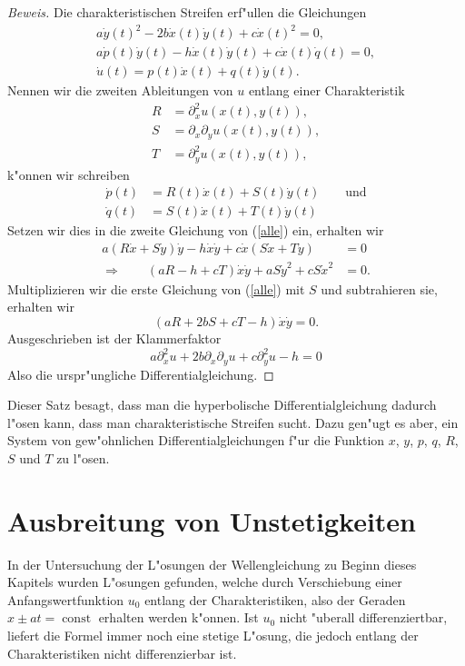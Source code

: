 \begin{proof}[Beweis]
Die charakteristischen Streifen erf"ullen die Gleichungen
\begin{equation}
\begin{gathered}
a\dot y(t)^2-2b\dot x(t)\dot y(t)+c\dot x(t)^2=0,
\\
a\dot p(t)\dot y(t)-h\dot x(t)\dot y(t)+c\dot x(t)\dot q(t)=0,
\\
\dot u(t)=p(t)\dot x(t)+q(t)\dot y(t).
\end{gathered}
\label{alle}
\end{equation}
Nennen wir die zweiten Ableitungen von $u$ entlang einer Charakteristik
\begin{align*}
R&=\partial_x^2u(x(t),y(t)),
\\
S&=\partial_x\partial_yu(x(t),y(t)),
\\
T&=\partial_y^2u(x(t),y(t)),
\end{align*}
k"onnen wir schreiben
\begin{align*}
\dot p(t)&=R(t)\dot x(t)+S(t)\dot y(t)\qquad\text{und}\\
\dot q(t)&=S(t)\dot x(t)+T(t)\dot y(t)
\end{align*}
Setzen wir dies in die zweite Gleichung von (\ref{alle}) ein, erhalten wir
\begin{align*}
a(R\dot x+S\dot y)\dot y-h\dot x\dot y+c\dot x(S\dot x+T\dot y)&=0
\\
\Rightarrow \qquad(aR-h+cT)\dot x\dot y+aS\dot y^2 +cS \dot x^2&=0.
\end{align*}
Multiplizieren wir die erste Gleichung von (\ref{alle}) mit $S$ und subtrahieren
sie, erhalten wir
\[
(aR+2bS+cT-h)\dot x\dot y=0.
\]
Ausgeschrieben ist der Klammerfaktor
\[
a\partial_x^2u+2b\partial_x\partial_yu+c\partial_y^2u-h=0
\]
Also die urspr"ungliche Differentialgleichung.
\end{proof}
Dieser Satz besagt, dass man die hyperbolische Differentialgleichung dadurch
l"osen kann, dass man charakteristische Streifen sucht. Dazu gen"ugt
es aber, ein System von gew"ohnlichen Differentialgleichungen
f"ur die Funktion $x$, $y$, $p$, $q$, $R$, $S$ und $T$
zu l"osen.

\section{Ausbreitung von Unstetigkeiten}
In der Untersuchung der L"osungen der Wellengleichung zu Beginn
dieses Kapitels wurden L"osungen gefunden, welche durch Verschiebung
einer Anfangswertfunktion $u_0$ entlang der 
Charakteristiken, also der Geraden 
$x\pm at=\operatorname{const}$ erhalten werden k"onnen. Ist $u_0$
nicht "uberall differenziertbar, liefert die Formel immer noch eine
stetige L"osung, die jedoch entlang der Charakteristiken nicht
differenzierbar ist.

